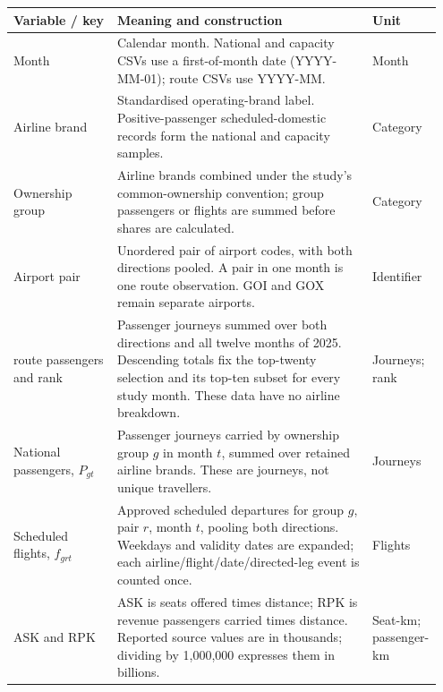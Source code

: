 \begin{tabular}{@{}>{\raggedright\arraybackslash}p{0.24\linewidth}>{\raggedright\arraybackslash}p{0.59\linewidth}>{\raggedright\arraybackslash}p{0.12\linewidth}@{}}
\toprule
Variable / key & Meaning and construction & Unit \\
\midrule
Month & Calendar month. National and capacity CSVs use a first-of-month date (YYYY-MM-01); route CSVs use YYYY-MM. & Month \\
\addlinespace[5pt]
Airline brand & Standardised operating-brand label. Positive-passenger scheduled-domestic records form the national and capacity samples. & Category \\
\addlinespace[5pt]
Ownership group & Airline brands combined under the study's common-ownership convention; group passengers or flights are summed before shares are calculated. & Category \\
\addlinespace[5pt]
Airport pair & Unordered pair of airport codes, with both directions pooled. A pair in one month is one route observation. GOI and GOX remain separate airports. & Identifier \\
\addlinespace[5pt]
2025 route passengers and rank & Passenger journeys summed over both directions and all twelve months of 2025. Descending totals fix the top-twenty selection and its top-ten subset for every study month. These data have no airline breakdown. & Journeys; rank \\
\addlinespace[5pt]
National passengers, $P_{gt}$ & Passenger journeys carried by ownership group $g$ in month $t$, summed over retained airline brands. These are journeys, not unique travellers. & Journeys \\
\addlinespace[5pt]
Scheduled flights, $f_{grt}$ & Approved scheduled departures for group $g$, pair $r$, month $t$, pooling both directions. Weekdays and validity dates are expanded; each airline/flight/date/directed-leg event is counted once. & Flights \\
\addlinespace[5pt]
ASK and RPK & ASK is seats offered times distance; RPK is revenue passengers carried times distance. Reported source values are in thousands; dividing by 1,000,000 expresses them in billions. & Seat-km; passenger-km \\
\bottomrule
\end{tabular}
